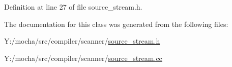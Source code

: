 Definition at line 27 of file source\_\-stream.h.



The documentation for this class was generated from the following files:\begin{DoxyCompactItemize}
\item 
Y:/mocha/src/compiler/scanner/\hyperlink{source__stream_8h}{source\_\-stream.h}\item 
Y:/mocha/src/compiler/scanner/\hyperlink{source__stream_8cc}{source\_\-stream.cc}\end{DoxyCompactItemize}
